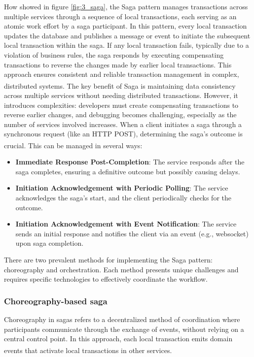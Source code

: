 How showed in figure \ref{fig:3_saga}, the Saga pattern manages transactions across multiple
services through a sequence of local transactions, each serving as an atomic work effort by a saga
participant. In this pattern, every local transaction updates the database and publishes a message
or event to initiate the subsequent local transaction within the saga. If any local transaction
fails, typically due to a violation of business rules, the saga responds by executing compensating
transactions to reverse the changes made by earlier local transactions. This approach ensures
consistent and reliable transaction management in complex, distributed
systems\textsuperscript{\cite{ms_sagas}}\textsuperscript{\cite{io_sagas}}.
\newline\newline
The key benefit of Saga is maintaining data consistency across multiple services without needing
distributed transactions. However, it introduces complexities: developers must create compensating
transactions to reverse earlier changes, and debugging becomes challenging, especially as the number
of services involved increases.
When a client initiates a saga through a synchronous request (like an HTTP POST), determining the
saga's outcome is crucial. This can be managed in several ways\textsuperscript{\cite{io_sagas}}:

\begin{itemize}
    \item \textbf{Immediate Response Post-Completion}: The service responds after the saga
          completes, ensuring a definitive outcome but possibly causing delays.
    \item \textbf{Initiation Acknowledgement with Periodic Polling}: The service acknowledges the
          saga's start, and the client periodically checks for the outcome.
    \item \textbf{Initiation Acknowledgement with Event Notification}: The service sends an initial
          response and notifies the client via an event (e.g., websocket) upon saga completion.
\end{itemize}

There are two prevalent methods for implementing the Saga pattern: choreography and orchestration.
Each method presents unique challenges and requires specific technologies to effectively coordinate
the workflow.

\subsubsection{Choreography-based saga}
Choreography in sagas refers to a decentralized method of coordination where participants
communicate through the exchange of events, without relying on a central control point. In this
approach, each local transaction emits domain events that activate local transactions in
other services\textsuperscript{\cite{ms_sagas}}.

